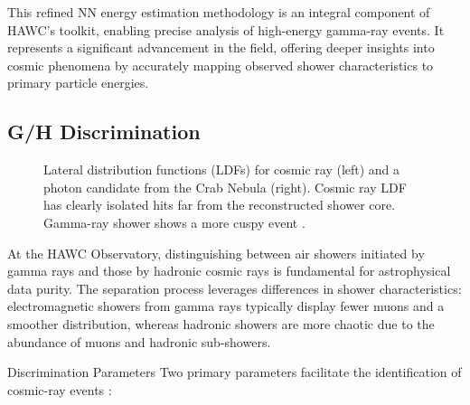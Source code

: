 This refined NN energy estimation methodology is an integral component of HAWC's toolkit, enabling precise analysis of high-energy gamma-ray events.
It represents a significant advancement in the field, offering deeper insights into cosmic phenomena by accurately mapping observed shower characteristics to primary particle energies.

\subsection{G/H Discrimination}\label{hawc:gammaHadron}

\begin{figure}
    \caption{Lateral distribution functions (LDFs) for cosmic ray (left) and a photon candidate from the Crab Nebula (right). Cosmic ray LDF has clearly isolated hits far from the reconstructed shower core. Gamma-ray shower shows a more cuspy event \cite{Abeysekara_2017}.}
    \label{fig:ldf_particleshower}
\end{figure}

At the HAWC Observatory, distinguishing between air showers initiated by gamma rays and those by hadronic cosmic rays is fundamental for astrophysical data purity.
The separation process leverages differences in shower characteristics: electromagnetic showers from gamma rays typically display fewer muons and a smoother distribution, whereas hadronic showers are more chaotic due to the abundance of muons and hadronic sub-showers.

Discrimination Parameters
Two primary parameters facilitate the identification of cosmic-ray events \cite{Abeysekara_2017}:

